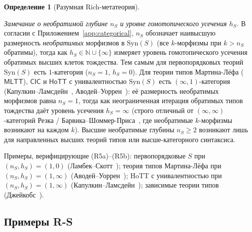 \documentclass[11pt]{article}
\theoremstyle{plain}
\theoremstyle{definition}
\newtheorem{definition}[theorem]{Определение}
\newcommand{\Syn}{\mathrm{Syn}}
\newcommand{\MLTT}{\mathsf{MLTT}}
\newcommand{\HoTT}{\mathsf{HoTT}}
\newcommand{\CIC}{\mathsf{CIC}}
\begin{document}
\begin{definition}[Разумная Rich-метатеория]
\begin{itemize}
\emph{Замечание о необратимой глубине $n_S$ и уровне гомотопического усечения $h_S$.} В согласии с Приложением~\ref{app:categorical}, $n_S$ обозначает наивысшую размерность \emph{необратимых} морфизмов в $\Syn(S)$ (все $k$-морфизмы при $k > n_S$ обратимы), тогда как $h_S \in \mathbb{N} \cup \{\infty\}$ измеряет уровень гомотопического усечения обратимых высших клеток тождества. Тем самым для первопорядковых теорий $\Syn(S)$ есть $1$-категория ($n_S = 1$, $h_S = 0$). Для теории типов Мартина-Лёфа ($\MLTT$), $\CIC$ и $\HoTT$ с унивалентностью $\Syn(S)$ есть $(\infty, 1)$-категория (Капулкин--Ламсдейн~\cite{KapulkinLumsdaine2021}, Аводей--Уоррен~\cite{AwodeyWarren2009}): её размерность необратимых морфизмов равна $n_S = 1$, тогда как неограниченная итерация обратимых типов тождества даёт уровень усечения $h_S = \infty$ (строго отличный от $(\infty, \infty)$-категорий Резка / Барвика--Шоммер-Приса~\cite{BarwickSchommerPries2021}, где необратимые $k$-морфизмы возникают на каждом $k$). Высшие необратимые глубины $n_S \ge 2$ возникают лишь для направленных высших теорий типов или высше-категорного синтаксиса.

Примеры, верифицирующие (R5a)--(R5b): первопорядковые $S$ при $(n_S, h_S) = (1, 0)$ (Ламбек--Скотт~\cite{LambekScott1986}); теория типов Мартина-Лёфа при $(n_S, h_S) = (1, \infty)$ (Аводей--Уоррен~\cite{AwodeyWarren2009}); HoTT с унивалентностью при $(n_S, h_S) = (1, \infty)$ (Капулкин--Ламсдейн~\cite{KapulkinLumsdaine2021}); зависимые теории типов (Джейкобс~\cite{Jacobs1999}).
\end{itemize}
\end{definition}

\subsection{Примеры R-S}
\end{document}
